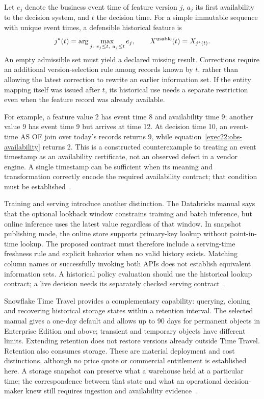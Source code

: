 Let $e_j$ denote the business event time of feature version $j$, $a_j$ its first
availability to the decision system, and $t$ the decision time. For a simple
immutable sequence with unique event times, a defensible historical feature is
\begin{equation}
 j^*(t)=\arg\max_{j:\ e_j\leq t,\ a_j\leq t} e_j,
 \qquad X^{\rm usable}(t)=X_{j^*(t)}.
 \label{exec22:obs-availability}
\end{equation}
An empty admissible set must yield a declared missing result. Corrections require
an additional version-selection rule among records known by $t$, rather than
allowing the latest correction to rewrite an earlier information set. If the
entity mapping itself was issued after $t$, its historical use needs a separate
restriction even when the feature record was already available.

For example, a feature value 2 has event time 8 and availability time 9; another
value 9 has event time 9 but arrives at time 12. At decision time 10, an event-time
AS OF join over today's records returns 9, while
equation~\eqref{exec22:obs-availability} returns 2. This is a constructed
counterexample to treating an event timestamp as an availability certificate,
not an observed defect in a vendor engine. A single timestamp can be sufficient
when its meaning and transformation correctly encode the required availability
contract; that condition must be established~\citep{exec22_obs_reference}.

Training and serving introduce another distinction. The Databricks manual says
that the optional lookback window constrains training and batch inference, but
online inference uses the latest value regardless of that window. In snapshot
publishing mode, the online store supports primary-key lookup without
point-in-time lookup. The proposed contract must therefore include a serving-time
freshness rule and explicit behavior when no valid history exists. Matching column
names or successfully invoking both APIs does not establish equivalent information
sets. A historical policy evaluation should use the historical lookup contract;
a live decision needs its separately checked serving contract~\citep{exec22_obs_databricks_pit}.

Snowflake Time Travel provides a complementary capability: querying, cloning and
recovering historical storage states within a retention interval. The selected
manual gives a one-day default and allows up to 90 days for permanent objects in
Enterprise Edition and above; transient and temporary objects have different
limits. Extending retention does not restore versions already outside Time Travel.
Retention also consumes storage. These are material deployment and cost
distinctions, although no price quote or commercial entitlement is established
here. A storage snapshot can preserve what a warehouse held at a particular time;
the correspondence between that state and what an operational decision-maker knew
still requires ingestion and availability evidence~\citep{exec22_obs_snowflake_time}.

